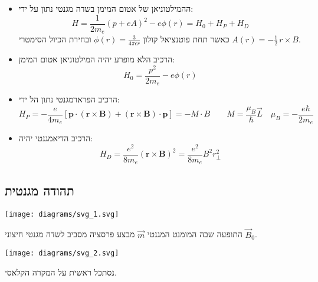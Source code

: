 \documentclass{tstextbook}
\begin{document}
\begin{summary}
  \begin{itemize}
    \item ההמילטוניאן של אטום המימן בשדה מגנטי נתון על ידי:
$$H=\frac{1}{2m_{e}}\left(p+e A\right)^{2}-e\phi(r)=H_{0}+H_{P}+H_{D}$$
כאשר תחת פוטנציאל קולון \(\phi(r)=\frac{3}{4\pi \epsilon r}\) ובחירת הכיול הסימטרי \(A(r)=-\frac{1}{2}\,r\times B\).
    \item הרכיב הלא מופרע יהיה המילטוניאן אטום המימן:
$$H_{0}=\frac{p^{2}}{2m_{e}}-e\phi(r)$$
    \item הרכיב הפרארמגנטי נתון הל ידי:
$$H_{P}=-{\frac{e}{4m_{e}}}\left[\mathbf{p}\cdot\left( \mathbf{r}\times\mathbf{B} \right)+\left( \mathbf{r}\times\mathbf{B} \right)\cdot\mathbf{p}\right]=-M\cdot B\qquad M=\frac{\mu_{B}}{\hbar}\vec{L}\quad\mu_{B}=-\frac{e\hbar}{2m_{e}}$$
    \item הרכיב הדיאמגנטי יהיה:
$$H_{D}=\frac{e^{2}}{8m_{e}}\left(\mathbf{r}\times\mathbf{B}\right)^{2}=\frac{e^{2}}{8m_{e}}B^{2}r_{\perp}^{2}$$
  \end{itemize}
\end{summary}
\subsection{תהודה מגנטית}

\begin{reminder}
\texttt{[image: diagrams/svg\_1.svg]}
\end{reminder}
\begin{definition}
התופעה שבה המומנט המגנטי \(\vec{m}\) מבצע פרסציה מסביב לשדה מגנטי חיצוני \(\vec{B}_{0}\).

\texttt{[image: diagrams/svg\_2.svg]}
\end{definition}
נסתכל ראשית על המקרה הקלאסי.
\end{document}
